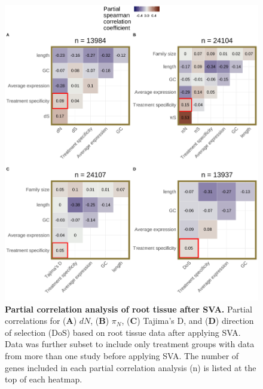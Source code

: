 \documentclass[12pt]{article}
\begin{document}
\begin{figure}[H]
\includegraphics[width=\linewidth, height=\textheight, keepaspectratio]{figures/appendix_a/partialCorrelations_withoutTissueSpecificityAfterSVA_root_2023-02-21.pdf}
\caption{\textbf{Partial correlation analysis of root tissue after SVA.} Partial correlations for (\textbf{A}) $dN$, (\textbf{B}) $\pi_N$, (\textbf{C}) Tajima's D, and (\textbf{D}) direction of selection (DoS) based on root tissue data after applying SVA. Data was further subset to include only treatment groups with data from more than one study before applying SVA. The number of genes included in each partial correlation analysis (n) is listed at the top of each heatmap.}%
\end{figure}

\newpage
\end{document}
